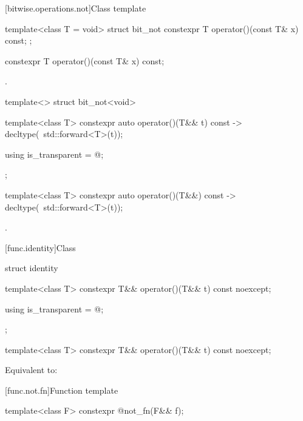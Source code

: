[bitwise.operations.not]{Class template }

\begin{itemdecl}
template<class T = void> struct bit_not {
  constexpr T operator()(const T& x) const;
};
\end{itemdecl}

%
\begin{itemdecl}
constexpr T operator()(const T& x) const;
\end{itemdecl}

\begin{itemdescr}
\pnum
\returns
{}.
\end{itemdescr}

%
\begin{itemdecl}
template<> struct bit_not<void> {
  template<class T> constexpr auto operator()(T&& t) const
    -> decltype(~std::forward<T>(t));

  using is_transparent = @\unspec@;
};
\end{itemdecl}

%
\begin{itemdecl}
template<class T> constexpr auto operator()(T&&) const
    -> decltype(~std::forward<T>(t));
\end{itemdecl}

\begin{itemdescr}
\pnum
\returns
{}.
\end{itemdescr}


[func.identity]{Class }

%
\begin{itemdecl}
struct identity {
  template<class T>
    constexpr T&& operator()(T&& t) const noexcept;

  using is_transparent = @\unspec@;
};

template<class T>
  constexpr T&& operator()(T&& t) const noexcept;
\end{itemdecl}

\begin{itemdescr}
\pnum
\effects
Equivalent to: 
\end{itemdescr}


[func.not.fn]{Function template }

%
\begin{itemdecl}
template<class F> constexpr @\unspec@ not_fn(F&& f);
\end{itemdecl}


